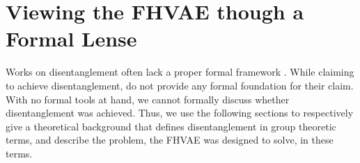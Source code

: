 \documentclass{article} %
\begin{document}



\section*{Viewing the FHVAE though a Formal Lense}
Works on disentanglement often lack a proper formal framework \cite{higgins2018towards}. While claiming to achieve disentanglement, \citet{hsu2017unsupervised} do not provide any formal foundation for their claim. With no formal tools at hand, we cannot formally discuss whether disentanglement was achieved. Thus, we use the following sections to respectively give a theoretical background that defines disentanglement in group theoretic terms, and describe the problem, the FHVAE was designed to solve, in these terms.
\end{document}

